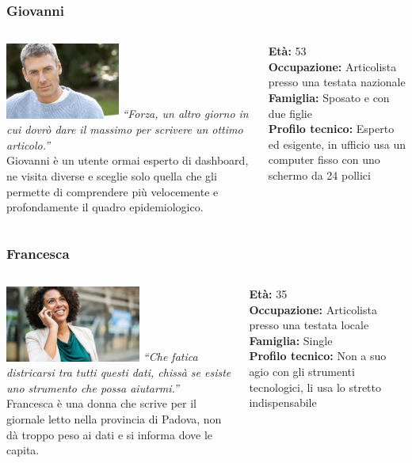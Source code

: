 \documentclass[handout]{beamer}
\begin{document}
		\begin{frame}
			\frametitle{Giovanni}
			\begin{columns}[t]
				\begin{column}[T]{6cm}
					\includegraphics[height=2.5cm]{img/giovanni}
					\textit{``Forza, un altro giorno in cui dovrò dare il massimo per scrivere un ottimo articolo.''}\\
					Giovanni è un utente ormai esperto di dashboard, ne visita diverse e sceglie solo quella che gli permette di comprendere più velocemente e profondamente il quadro epidemiologico.
				\end{column}
				\begin{column}[T]{5cm}
					\textbf{Età:} 53\\
					\textbf{Occupazione:} Articolista presso una testata nazionale\\
					\textbf{Famiglia:} Sposato e con due figlie\\
					\textbf{Profilo tecnico:} Esperto ed esigente, in ufficio usa un computer fisso con uno schermo da 24 pollici\\
				\end{column}
			\end{columns}
		\end{frame}

		\begin{frame}
			\frametitle{Francesca}
			\begin{columns}[t]
				\begin{column}[T]{6cm}
					\includegraphics[height=2.5cm]{img/francesca}
					\textit{``Che fatica districarsi tra tutti questi dati, chissà se esiste uno strumento che possa aiutarmi.''}\\
					Francesca è una donna che scrive per il giornale letto nella provincia di Padova, non dà troppo peso ai dati e si informa dove le capita.
				\end{column}
				\begin{column}[T]{5cm}
					\textbf{Età:} 35\\
					\textbf{Occupazione:} Articolista presso una testata locale\\
					\textbf{Famiglia:} Single\\
					\textbf{Profilo tecnico:} Non a suo agio con gli strumenti tecnologici, li usa lo stretto indispensabile\\
				\end{column}
			\end{columns}
		\end{frame}
\end{document}
